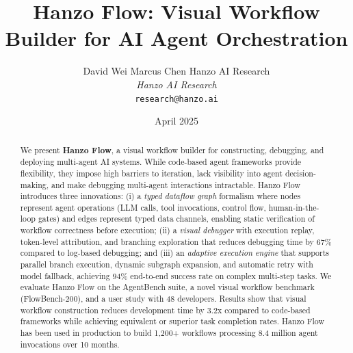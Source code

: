 \documentclass[11pt,twocolumn]{article}
\title{Hanzo Flow: Visual Workflow Builder for AI Agent Orchestration}
\author{
    David Wei \quad
    Marcus Chen \quad
    Hanzo AI Research \\
    \textit{Hanzo AI Research} \\
    \texttt{research@hanzo.ai}
}
\date{April 2025}
\begin{document}
\hanzocoverpage

\begin{abstract}
We present \textbf{Hanzo Flow}, a visual workflow builder for constructing, debugging, and deploying multi-agent AI systems. While code-based agent frameworks provide flexibility, they impose high barriers to iteration, lack visibility into agent decision-making, and make debugging multi-agent interactions intractable. Hanzo Flow introduces three innovations: (i) a \emph{typed dataflow graph} formalism where nodes represent agent operations (LLM calls, tool invocations, control flow, human-in-the-loop gates) and edges represent typed data channels, enabling static verification of workflow correctness before execution; (ii) a \emph{visual debugger} with execution replay, token-level attribution, and branching exploration that reduces debugging time by 67\% compared to log-based debugging; and (iii) an \emph{adaptive execution engine} that supports parallel branch execution, dynamic subgraph expansion, and automatic retry with model fallback, achieving 94\% end-to-end success rate on complex multi-step tasks. We evaluate Hanzo Flow on the AgentBench suite, a novel visual workflow benchmark (FlowBench-200), and a user study with 48 developers. Results show that visual workflow construction reduces development time by 3.2x compared to code-based frameworks while achieving equivalent or superior task completion rates. Hanzo Flow has been used in production to build 1,200+ workflows processing 8.4 million agent invocations over 10 months.
\end{abstract}











\end{document}
